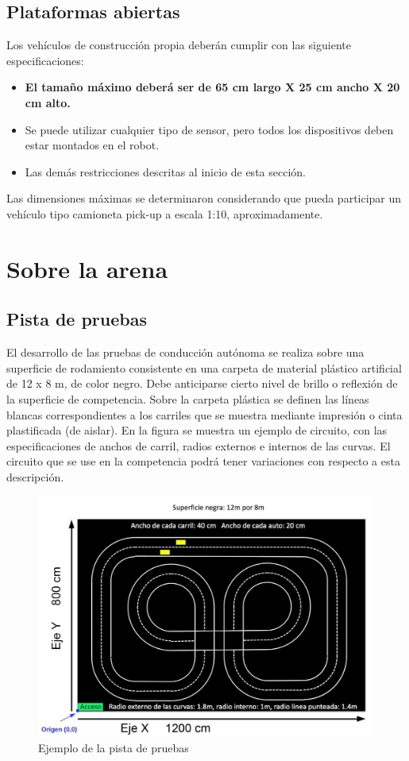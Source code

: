 \documentclass[letterpaper,12pt]{article}
\begin{document}
\subsection{Plataformas abiertas}
Los vehículos de construcción propia deberán cumplir con las siguiente especificaciones:
\begin{itemize}
\item \textbf{El tamaño máximo deberá ser de 65 cm largo X 25 cm ancho X 20 cm alto.}
\item Se puede utilizar cualquier tipo de sensor, pero todos los dispositivos deben estar
montados en el robot.
\item Las demás restricciones descritas al inicio de esta sección.
\end{itemize}
Las dimensiones máximas se determinaron considerando que pueda participar un vehículo tipo camioneta pick-up a escala 1:10, aproximadamente. 

\section{Sobre la arena}
\subsection{Pista de pruebas}
El desarrollo de las pruebas de conducción autónoma se realiza sobre una superficie de rodamiento consistente en una carpeta de material plástico artificial de 12 x 8 m, de color negro. Debe anticiparse cierto nivel de brillo o reflexión de la superficie de competencia. Sobre la
carpeta plástica se definen las líneas blancas correspondientes a los carriles que se muestra mediante impresión o cinta plastificada (de aislar). En la figura se muestra un ejemplo de circuito, con las especificaciones de anchos de carril, radios externos e internos de las curvas. El circuito que se use en la competencia podrá tener variaciones con respecto a esta descripción.

\begin{figure}
  \centering
  \includegraphics[width=\textwidth]{Figures/pista.png}
  \caption{Ejemplo de la pista de pruebas}
\end{figure}
\end{document}
